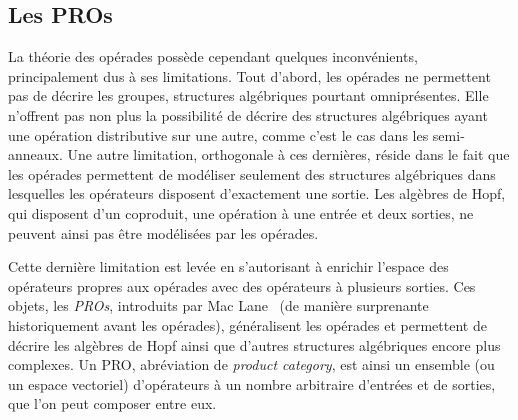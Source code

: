 \documentclass[10pt,reqno]{amsart}
\numberwithin{equation}{subsection}
\begin{document}
\subsection{Les PROs}
La théorie des opérades possède cependant quelques inconvénients,
principalement dus à ses limitations. Tout d'abord, les opérades ne
permettent pas de décrire les groupes, structures algébriques pourtant
omniprésentes. Elle n'offrent pas non plus la possibilité de décrire des
structures algébriques ayant une opération distributive sur une autre,
comme c'est le cas dans les semi-anneaux. Une autre limitation, orthogonale
à ces dernières, réside dans le fait que les opérades permettent de
modéliser seulement des structures algébriques dans lesquelles les
opérateurs disposent d'exactement une sortie. Les algèbres de Hopf, qui
disposent d'un coproduit, une opération à une entrée et deux sorties, ne
peuvent ainsi pas être modélisées par les opérades.

Cette dernière limitation est levée en s'autorisant à enrichir l'espace
des opérateurs propres aux opérades avec des opérateurs à plusieurs
sorties. Ces objets, les {\em PROs}, introduits par Mac Lane~\cite{McL65}
(de manière surprenante historiquement avant les opérades), généralisent
les opérades et permettent de décrire les algèbres de Hopf ainsi que
d'autres structures algébriques encore plus complexes. Un PRO,
abréviation de {\em product category}, est ainsi un ensemble (ou un
espace vectoriel) d'opérateurs à un nombre arbitraire d'entrées et de
sorties, que l'on peut composer entre eux.
\end{document}
